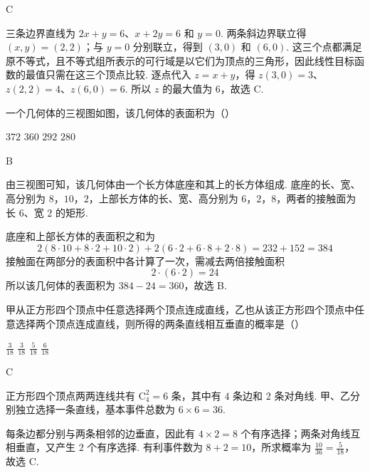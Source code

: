 \begin{answer}
C
\end{answer}

\begin{solution}
三条边界直线为 \(2x+y=6\)、\(x+2y=6\) 和 \(y=0\). 两条斜边界联立得 \((x,y)=(2,2)\)；与 \(y=0\) 分别联立，得到 \((3,0)\) 和 \((6,0)\). 这三个点都满足原不等式，且不等式组所表示的可行域是以它们为顶点的三角形，因此线性目标函数的最值只需在这三个顶点比较. 逐点代入 \(z=x+y\)，得 \(z(3,0)=3\)、\(z(2,2)=4\)、\(z(6,0)=6\). 所以 \(z\) 的最大值为 \(6\)，故选 C.
\end{solution}

\begin{problem}
一个几何体的三视图如图，该几何体的表面积为（\quad）


\choices
    {\(372\)}
    {\(360\)}
    {\(292\)}
    {\(280\)}
\end{problem}

\begin{answer}
B
\end{answer}

\begin{solution}
由三视图可知，该几何体由一个长方体底座和其上的长方体组成. 底座的长、宽、高分别为 \(8\)，\(10\)，\(2\)，上部长方体的长、宽、高分别为 \(6\)，\(2\)，\(8\)，两者的接触面为长 \(6\)、宽 \(2\) 的矩形.

底座和上部长方体的表面积之和为
\[
2(8\cdot10+8\cdot2+10\cdot2)+2(6\cdot2+6\cdot8+2\cdot8)=232+152=384
\]
接触面在两部分的表面积中各计算了一次，需减去两倍接触面积
\[
2\cdot(6\cdot2)=24
\]
所以该几何体的表面积为 \(384-24=360\)，故选 B.
\end{solution}

\begin{problem}
甲从正方形四个顶点中任意选择两个顶点连成直线，乙也从该正方形四个顶点中任意选择两个顶点连成直线，则所得的两条直线相互垂直的概率是（\quad）

\choices
    {\(\frac{3}{18}\)}
    {\(\frac{3}{18}\)}
    {\(\frac{5}{18}\)}
    {\(\frac{6}{18}\)}
\end{problem}

\begin{answer}
C
\end{answer}

\begin{solution}
正方形四个顶点两两连线共有 \(\mathrm C_4^2=6\) 条，其中有 \(4\) 条边和 \(2\) 条对角线. 甲、乙分别独立选择一条直线，基本事件总数为 \(6\times6=36\).

每条边都分别与两条相邻的边垂直，因此有 \(4\times2=8\) 个有序选择；两条对角线互相垂直，又产生 \(2\) 个有序选择. 有利事件数为 \(8+2=10\)，所求概率为
\(\frac{10}{36}=\frac5{18}\)，
故选 C.
\end{solution}

